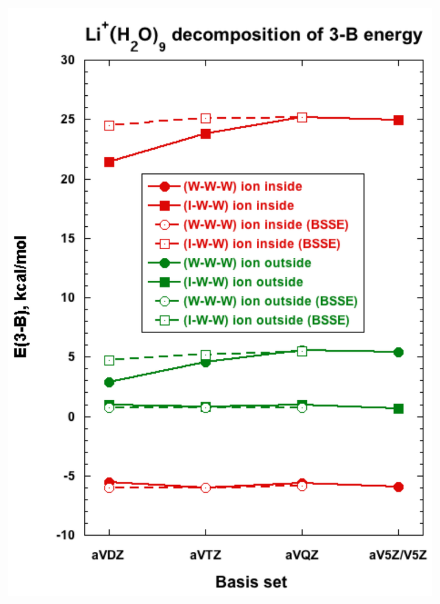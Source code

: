 \documentclass[11pt, proquest]{uwthesis}[2020/02/24]
\begin{document}
\begin{figure}[t]
\uwsinglespace
\begin{center}
\begin{minipage}{0.45\textwidth}
\includegraphics[width=.9\textwidth]{Figures/Chapter_3/figure_5_left.pdf}
\end{minipage}
\begin{minipage}{0.45\textwidth}

\end{minipage}
\end{center}
\end{figure}
\end{document}

